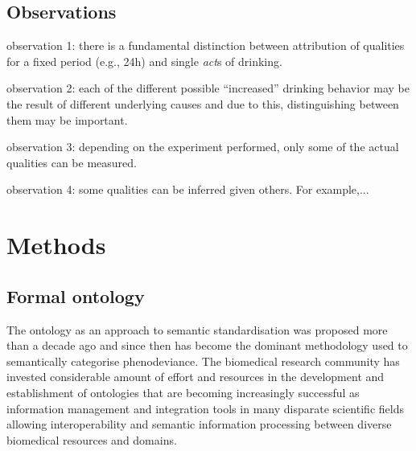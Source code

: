 \documentclass{bioinfo}
\begin{document}



\subsection{Observations}
observation 1: there is a fundamental distinction between attribution
of qualities for a fixed period (e.g., 24h) and single {\em act}s of
drinking.

observation 2: each of the different possible ``increased'' drinking
behavior may be the result of different underlying causes and due to
this, distinguishing between them may be important.

observation 3: depending on the experiment performed, only some of the
actual qualities can be measured.

observation 4: some qualities can be inferred given others. For
example,...

\section{Methods}
\subsection{Formal ontology}
The ontology as an approach to semantic standardisation was proposed
more than a decade ago and since then has become the dominant
methodology used to semantically categorise phenodeviance.  The
biomedical research community has invested considerable amount of
effort and resources in the development and establishment of
ontologies that are becoming increasingly successful as information
management and integration tools in many disparate scientific fields
allowing interoperability and semantic information processing between
diverse biomedical resources and domains.
\end{document}
